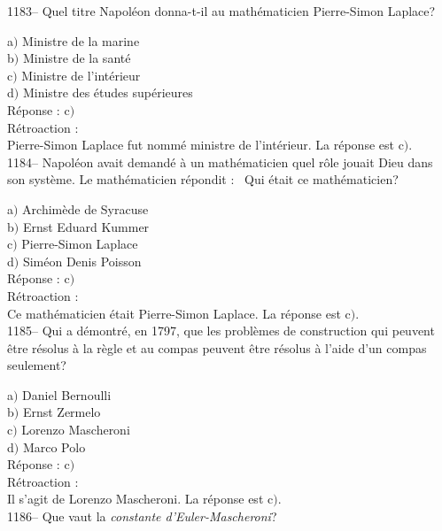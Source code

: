 ﻿\documentclass[letterpaper, 12pt]{article}
\begin{document}
1183-- Quel titre Napol\'eon  donna-t-il au math\'ematicien
Pierre-Simon Laplace?

a$)$ Ministre de la marine \\
b$)$ Ministre de la sant\'e \\
c$)$ Ministre de l'int\'erieur  \\
d$)$ Ministre des \'etudes sup\'erieures\\

R\'eponse : c$)$\\

R\'etroaction : \\
Pierre-Simon Laplace fut nomm\'e ministre de l'int\'erieur.
La r\'eponse est c$)$.\\

1184-- Napol\'eon avait demand\'e \`a un math\'ematicien quel r\^ole
jouait Dieu dans son syst\`eme. Le math\'ematicien r\'epondit :
\fg\ Qui
\'etait ce math\'ematicien?

a$)$ Archim\`ede de Syracuse \\
b$)$ Ernst Eduard Kummer \\
c$)$ Pierre-Simon Laplace \\
d$)$ Sim\'eon Denis Poisson\\

R\'eponse : c$)$\\

R\'etroaction : \\
Ce math\'ematicien \'etait Pierre-Simon Laplace.
La r\'eponse est c$)$.\\

1185-- Qui a d\'emontr\'e, en 1797, que les probl\`emes de
construction qui peuvent \^etre r\'esolus \`a la r\`egle et au
compas peuvent \^etre r\'esolus \`a l'aide d'un compas seulement?

a$)$ Daniel Bernoulli \\
b$)$ Ernst Zermelo \\
c$)$ Lorenzo Mascheroni \\
d$)$ Marco Polo\\

R\'eponse : c$)$\\

R\'etroaction : \\
Il s'agit de Lorenzo Mascheroni.
La r\'eponse est c$)$.\\

1186-- Que vaut la {\sl constante d'Euler-Mascheroni}?
\end{document}
